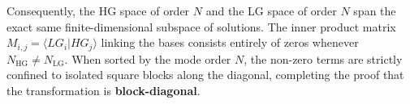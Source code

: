 \begin{resolucao}[Solution]
    Consequently, the HG space of order $N$ and the LG space of order $N$ span the exact same finite-dimensional subspace of solutions. The inner product matrix $M_{i,j} = \langle LG_i | HG_j \rangle$ linking the bases consists entirely of zeros whenever $N_{\text{HG}} \neq N_{\text{LG}}$. When sorted by the mode order $N$, the non-zero terms are strictly confined to isolated square blocks along the diagonal, completing the proof that the transformation is \textbf{block-diagonal}.

\end{resolucao}